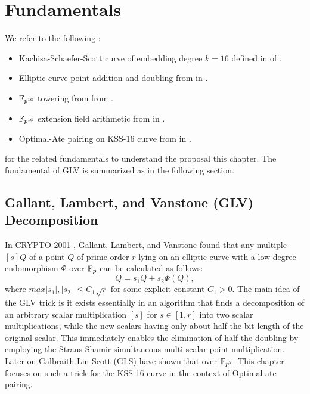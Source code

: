 \section{Fundamentals}
\label{sec:ch:candar18:fundamental}

We refer to the following :
\begin{itemize}
	\item Kachisa-Schaefer-Scott curve of embedding degree $k=16$ defined in   of .
	\item Elliptic curve point addition and doubling from  in .
	\item $\mathbb{F}_{p^{16}}$ towering from  from .
	\item $\mathbb{F}_{p^{16}}$ extension field arithmetic from  in .
	\item Optimal-Ate pairing on KSS-16 curve from  in .
\end{itemize}
for the related fundamentals to understand the proposal this chapter.
The fundamental of GLV is summarized as in the following section.

\subsection{Gallant, Lambert, and Vanstone (GLV) Decomposition}
In CRYPTO 2001 \cite{C:GalLamVan01}, Gallant, Lambert, and Vanstone found that any multiple $[s]Q$ of a point $Q$ of prime order $r$ lying on an elliptic curve with a low-degree endomorphism $\Phi$ over $\mathbb{F}_p$ can be calculated as follows:
\begin{equation}
    [s]Q = s_1 Q + s_2 \Phi(Q),  
\end{equation}
where $max{|s_1|,|s_2|}  ~\leq C_1 \sqrt{r}$ for some explicit constant $C_1 > 0$.
The main idea of the GLV trick is it exists essentially in an algorithm that finds a decomposition of an arbitrary scalar multiplication $[s]$ for $s \in  [1,r]$ into two scalar multiplications, while the new scalars having only about half the bit length of the original scalar.
This immediately enables the elimination of half the doubling by employing the Straus-Shamir simultaneous multi-scalar point multiplication. 
Later on Galbraith-Lin-Scott (GLS) have shown that over $\mathbb{F}_{p^2}$. 
This chapter focuses on such a trick for the KSS-16 curve in the context of Optimal-ate pairing. 

